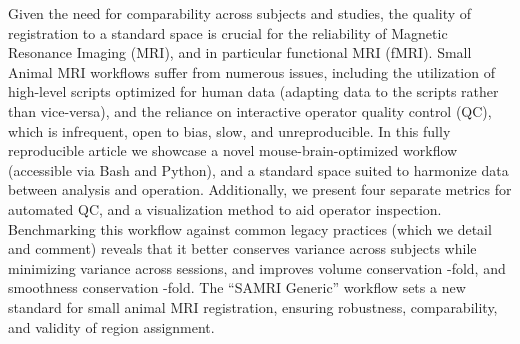 Given the need for comparability across subjects and studies, the quality of registration to a standard space is crucial for the reliability of Magnetic Resonance Imaging (MRI), and in particular functional MRI (fMRI).
Small Animal MRI workflows suffer from numerous issues, including the utilization of high-level scripts optimized for human data (adapting data to the scripts rather than vice-versa), and the reliance on interactive operator quality control (QC), which is infrequent, open to bias, slow, and unreproducible.
In this fully reproducible article we showcase a novel mouse-brain-optimized workflow (accessible via Bash and Python), and a standard space suited to harmonize data between analysis and operation.
Additionally, we present four separate metrics for automated QC, and a visualization method to aid operator inspection.
Benchmarking this workflow against common legacy practices (which we detail and comment) reveals that it better conserves variance across subjects while minimizing variance across sessions, and improves volume conservation
-fold,
and smoothness conservation -fold.
The “SAMRI Generic” workflow sets a new standard for small animal MRI registration, ensuring robustness, comparability, and validity of region assignment.
